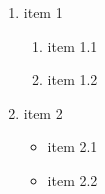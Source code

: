 \begin{enumerate}
	\item item 1
	\begin{enumerate}
		\item item 1.1
		\item item 1.2
	\end{enumerate}
	\item item 2
	\begin{itemize}
		\item item 2.1
		\item item 2.2
	\end{itemize}
\end{enumerate}
